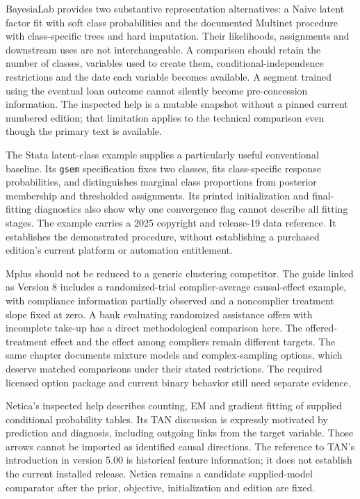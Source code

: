 BayesiaLab provides two substantive representation alternatives: a Naive
latent factor fit with soft class probabilities and the documented
Multinet procedure with class-specific trees and hard imputation. Their
likelihoods, assignments and downstream uses are not interchangeable. A
comparison should retain the number of classes, variables used to create
them, conditional-independence restrictions and the date each variable
becomes available. A segment trained using the eventual loan outcome
cannot silently become pre-concession information. The inspected help is
a mutable snapshot without a pinned current numbered edition; that
limitation applies to the technical comparison even though the primary
text is available.
\citep{exec13_latent_bayesia_data,exec13_latent_bayesia_variables}

The Stata latent-class example supplies a particularly useful
conventional baseline. Its \texttt{gsem} specification fixes two
classes, fits class-specific response probabilities, and distinguishes
marginal class proportions from posterior membership and thresholded
assignments. Its printed initialization and final-fitting diagnostics
also show why one convergence flag cannot describe all fitting stages.
The example carries a 2025 copyright and release-19 data reference. It
establishes the demonstrated procedure, without establishing a purchased
edition's current platform or automation entitlement.
\citep{exec13_latent_stata_lca}

Mplus should not be reduced to a generic clustering competitor. The
guide linked as Version 8 includes a randomized-trial complier-average
causal-effect example, with compliance information partially observed
and a noncomplier treatment slope fixed at zero. A bank evaluating
randomized assistance offers with incomplete take-up has a direct
methodological comparison here. The offered-treatment effect and the
effect among compliers remain different targets. The same chapter
documents mixture models and complex-sampling options, which deserve
matched comparisons under their stated restrictions. The required
licensed option package and current binary behavior still need separate
evidence. \citep{exec13_latent_mplus}

Netica's inspected help describes counting, EM and gradient fitting of
supplied conditional probability tables. Its TAN discussion is expressly
motivated by prediction and diagnosis, including outgoing links from the
target variable. Those arrows cannot be imported as identified causal
directions. The reference to TAN's introduction in version 5.00 is
historical feature information; it does not establish the current
installed release. Netica remains a candidate supplied-model comparator
after the prior, objective, initialization and edition are fixed.
\citep{exec13_latent_netica_algorithms,exec13_latent_netica_structure}


